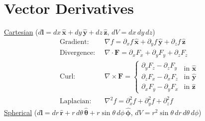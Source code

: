 \section*{Vector Derivatives}
\underline{Cartesian} ($d\mathbf{l} = dx\,\hat{\mathbf{x}} + dy\,\hat{\mathbf{y}} + dz\,\hat{\mathbf{z}}$, $dV = dx\,dy\,dz$)
\begin{align*}
\text{Gradient:}   \;\; &\nabla f = \partial_x f\,\hat{\mathbf{x}} 
                                 + \partial_y f\,\hat{\mathbf{y}} 
                                 + \partial_z f\,\hat{\mathbf{z}} \\
\text{Divergence:} \;\; &\nabla \cdot \mathbf{F} = \partial_x F_x 
                                 + \partial_y F_y 
                                 + \partial_z F_z \\
\text{Curl:}       \;\; &\nabla \times \mathbf{F} = \begin{cases}
                                  \partial_y F_z - \partial_z F_y \\[2pt]
                                  \partial_z F_x - \partial_x F_z \\[2pt]
                                  \partial_x F_y - \partial_y F_x
                                  \end{cases} 
                                  \begin{matrix}
                                  \text{in } \hat{\mathbf{x}} \\[2pt]
                                  \text{in } \hat{\mathbf{y}} \\[2pt]
                                  \text{in } \hat{\mathbf{z}}
                                  \end{matrix} \\
\text{Laplacian:}  \;\; &\nabla^2 f = \partial^2_x f + \partial^2_y f + \partial^2_z f
\end{align*}
\underline{Spherical} ($d\mathbf{l} = dr\,\hat{\mathbf{r}} + r\,d\theta\,\bm{\hat{\theta}} + r\sin\theta\,d\phi\,\bm{\hat{\phi}}$, $dV = r^2\sin\theta\,dr\,d\theta\,d\phi$)
